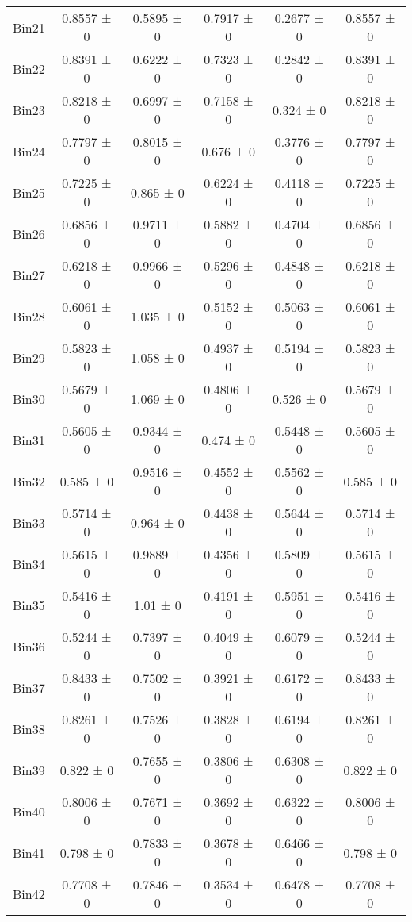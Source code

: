 \begin{tabular}{@{\extracolsep{4pt}}lccccc@{}}
     Bin21 & 0.8557 ± 0 & 0.5895 ± 0 & 0.7917 ± 0 & 0.2677 ± 0 & 0.8557 ± 0 \\ 
     Bin22 & 0.8391 ± 0 & 0.6222 ± 0 & 0.7323 ± 0 & 0.2842 ± 0 & 0.8391 ± 0 \\ 
     Bin23 & 0.8218 ± 0 & 0.6997 ± 0 & 0.7158 ± 0 & 0.324 ± 0 & 0.8218 ± 0 \\ 
     Bin24 & 0.7797 ± 0 & 0.8015 ± 0 & 0.676 ± 0 & 0.3776 ± 0 & 0.7797 ± 0 \\ 
     Bin25 & 0.7225 ± 0 & 0.865 ± 0 & 0.6224 ± 0 & 0.4118 ± 0 & 0.7225 ± 0 \\ 
     Bin26 & 0.6856 ± 0 & 0.9711 ± 0 & 0.5882 ± 0 & 0.4704 ± 0 & 0.6856 ± 0 \\ 
     Bin27 & 0.6218 ± 0 & 0.9966 ± 0 & 0.5296 ± 0 & 0.4848 ± 0 & 0.6218 ± 0 \\ 
     Bin28 & 0.6061 ± 0 & 1.035 ± 0 & 0.5152 ± 0 & 0.5063 ± 0 & 0.6061 ± 0 \\ 
     Bin29 & 0.5823 ± 0 & 1.058 ± 0 & 0.4937 ± 0 & 0.5194 ± 0 & 0.5823 ± 0 \\ 
     Bin30 & 0.5679 ± 0 & 1.069 ± 0 & 0.4806 ± 0 & 0.526 ± 0 & 0.5679 ± 0 \\ 
     Bin31 & 0.5605 ± 0 & 0.9344 ± 0 & 0.474 ± 0 & 0.5448 ± 0 & 0.5605 ± 0 \\ 
     Bin32 & 0.585 ± 0 & 0.9516 ± 0 & 0.4552 ± 0 & 0.5562 ± 0 & 0.585 ± 0 \\ 
     Bin33 & 0.5714 ± 0 & 0.964 ± 0 & 0.4438 ± 0 & 0.5644 ± 0 & 0.5714 ± 0 \\ 
     Bin34 & 0.5615 ± 0 & 0.9889 ± 0 & 0.4356 ± 0 & 0.5809 ± 0 & 0.5615 ± 0 \\ 
     Bin35 & 0.5416 ± 0 & 1.01 ± 0 & 0.4191 ± 0 & 0.5951 ± 0 & 0.5416 ± 0 \\ 
     Bin36 & 0.5244 ± 0 & 0.7397 ± 0 & 0.4049 ± 0 & 0.6079 ± 0 & 0.5244 ± 0 \\ 
     Bin37 & 0.8433 ± 0 & 0.7502 ± 0 & 0.3921 ± 0 & 0.6172 ± 0 & 0.8433 ± 0 \\ 
     Bin38 & 0.8261 ± 0 & 0.7526 ± 0 & 0.3828 ± 0 & 0.6194 ± 0 & 0.8261 ± 0 \\ 
     Bin39 & 0.822 ± 0 & 0.7655 ± 0 & 0.3806 ± 0 & 0.6308 ± 0 & 0.822 ± 0 \\ 
     Bin40 & 0.8006 ± 0 & 0.7671 ± 0 & 0.3692 ± 0 & 0.6322 ± 0 & 0.8006 ± 0 \\ 
     Bin41 & 0.798 ± 0 & 0.7833 ± 0 & 0.3678 ± 0 & 0.6466 ± 0 & 0.798 ± 0 \\ 
     Bin42 & 0.7708 ± 0 & 0.7846 ± 0 & 0.3534 ± 0 & 0.6478 ± 0 & 0.7708 ± 0 \\ 

\end{tabular}
